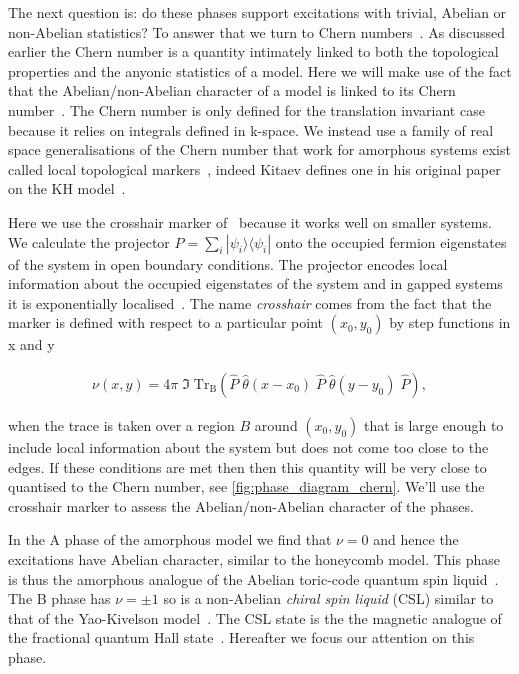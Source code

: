 The next question is: do these phases support excitations with trivial, Abelian or non-Abelian statistics? To answer that we turn to Chern numbers~\autocite{berryQuantalPhaseFactors1984,simonHolonomyQuantumAdiabatic1983,thoulessQuantizedHallConductance1982}. As discussed earlier the Chern number is a quantity intimately linked to both the topological properties and the anyonic statistics of a model. Here we will make use of the fact that the Abelian/non-Abelian character of a model is linked to its Chern number~\autocite{kitaevAnyonsExactlySolved2006}. The Chern number is only defined for the translation invariant case because it relies on integrals defined in k-space. We instead use a family of real space generalisations of the Chern number that work for amorphous systems exist called local topological markers~\autocite{bianco_mapping_2011,Hastings_Almost_2010,mitchellAmorphousTopologicalInsulators2018}, indeed Kitaev defines one in his original paper on the KH model~\autocite{kitaevAnyonsExactlySolved2006}.

Here we use the crosshair marker of~\autocite{peru_preprint} because it works well on smaller systems. We calculate the projector \(P = \sum_i |\psi_i\rangle \langle \psi_i|\) onto the occupied fermion eigenstates of the system in open boundary conditions. The projector encodes local information about the occupied eigenstates of the system and in gapped systems it is exponentially localised~\autocite{hastingsLiebSchultzMattisHigherDimensions2004}. The name \emph{crosshair} comes from the fact that the marker is defined with respect to a particular point \((x_0, y_0)\) by step functions in x and y

\[\begin{aligned}
    \nu (x, y) = 4\pi \; \Im\; \mathrm{Tr}_{\mathrm{B}} 
    \left ( 
    \hat{P}\;\hat{\theta}(x-x_0)\;\hat{P}\;\hat{\theta}(y-y_0)\; \hat{P}
    \right ),
\end{aligned}\]

when the trace is taken over a region \(B\) around \((x_0, y_0)\) that is large enough to include local information about the system but does not come too close to the edges. If these conditions are met then then this quantity will be very close to quantised to the Chern number, see \cref{fig:phase_diagram_chern}. We'll use the crosshair marker to assess the Abelian/non-Abelian character of the phases.

In the A phase of the amorphous model we find that \(\nu=0\) and hence the excitations have Abelian character, similar to the honeycomb model. This phase is thus the amorphous analogue of the Abelian toric-code quantum spin liquid~\autocite{kitaev_fault-tolerant_2003}. The B phase has \(\nu=\pm1\) so is a non-Abelian \emph{chiral spin liquid} (CSL) similar to that of the Yao-Kivelson model~\autocite{yaoExactChiralSpin2007}. The CSL state is the the magnetic analogue of the fractional quantum Hall state~\autocite{laughlinPropertiesChiralspinliquidState1990}. Hereafter we focus our attention on this phase.

